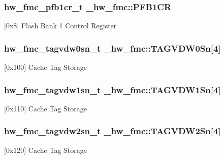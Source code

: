\subsubsection[{\texorpdfstring{P\+F\+B1\+CR}{PFB1CR}}]{ {\bf hw\+\_\+fmc\+\_\+pfb1cr\+\_\+t} \+\_\+hw\+\_\+fmc\+::\+P\+F\+B1\+CR}\hypertarget{struct__hw__fmc_acd2b2fd6e65268ca154dc686660f28f5}{}\label{struct__hw__fmc_acd2b2fd6e65268ca154dc686660f28f5}
\mbox{[}0x8\mbox{]} Flash Bank 1 Control Register 
\subsubsection[{\texorpdfstring{T\+A\+G\+V\+D\+W0\+Sn}{TAGVDW0Sn}}]{ {\bf hw\+\_\+fmc\+\_\+tagvdw0sn\+\_\+t} \+\_\+hw\+\_\+fmc\+::\+T\+A\+G\+V\+D\+W0\+Sn\mbox{[}4\mbox{]}}\hypertarget{struct__hw__fmc_a67ddf2e91d7bffa40488d682e5141067}{}\label{struct__hw__fmc_a67ddf2e91d7bffa40488d682e5141067}
\mbox{[}0x100\mbox{]} Cache Tag Storage 
\subsubsection[{\texorpdfstring{T\+A\+G\+V\+D\+W1\+Sn}{TAGVDW1Sn}}]{ {\bf hw\+\_\+fmc\+\_\+tagvdw1sn\+\_\+t} \+\_\+hw\+\_\+fmc\+::\+T\+A\+G\+V\+D\+W1\+Sn\mbox{[}4\mbox{]}}\hypertarget{struct__hw__fmc_a7e0c09b38761014ad55d3022e0d9290b}{}\label{struct__hw__fmc_a7e0c09b38761014ad55d3022e0d9290b}
\mbox{[}0x110\mbox{]} Cache Tag Storage 
\subsubsection[{\texorpdfstring{T\+A\+G\+V\+D\+W2\+Sn}{TAGVDW2Sn}}]{ {\bf hw\+\_\+fmc\+\_\+tagvdw2sn\+\_\+t} \+\_\+hw\+\_\+fmc\+::\+T\+A\+G\+V\+D\+W2\+Sn\mbox{[}4\mbox{]}}\hypertarget{struct__hw__fmc_ab87d5a7204023e87264737d1ecbc6ace}{}\label{struct__hw__fmc_ab87d5a7204023e87264737d1ecbc6ace}
\mbox{[}0x120\mbox{]} Cache Tag Storage 
